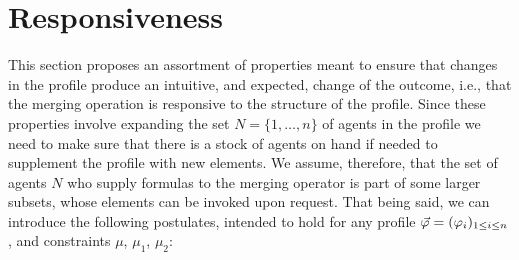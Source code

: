 























\section{Responsiveness}\label{sec:5-responsiveness}
This section proposes an assortment of properties 
meant to ensure that changes in the profile 
produce an intuitive, and expected, change of the outcome,
i.e., that the merging operation is responsive to 
the structure of the profile.
Since these properties involve expanding the set $N=\{1,\dots,n\}$ 
of agents in the profile
we need to make sure that there is a stock of agents 
on hand if needed to supplement the profile 
with new elements.
We assume, therefore, that the set of agents $N$
who supply formulas to the merging operator 
is part of some larger subsets,
whose elements can be invoked upon request.
That being said, we can introduce the following postulates,
intended to hold for any profile
$\P=(\phi_i)_{1\le i \le n}$, 
and constraints $\mu$, $\mu_1$, $\mu_2$:

